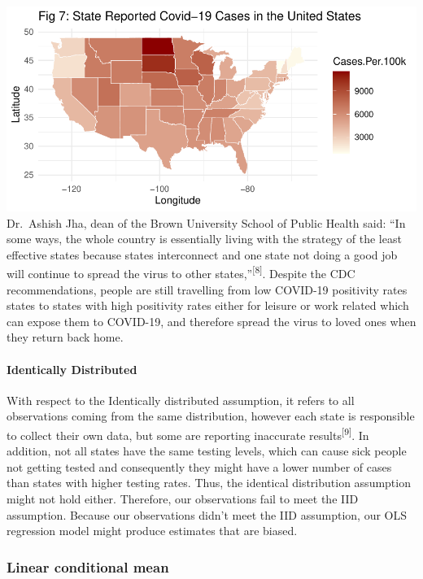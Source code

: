 \documentclass[
]{article}
\begin{document}
\includegraphics{Final_Report_files/figure-latex/iid-1.pdf} Dr.~Ashish
Jha, dean of the Brown University School of Public Health said: ``In
some ways, the whole country is essentially living with the strategy of
the least effective states because states interconnect and one state not
doing a good job will continue to spread the virus to other
states,''\textsuperscript{{[}8{]}}. Despite the CDC recommendations,
people are still travelling from low COVID-19 positivity rates states to
states with high positivity rates either for leisure or work related
which can expose them to COVID-19, and therefore spread the virus to
loved ones when they return back home.

\hypertarget{identically-distributed}{%
\paragraph{Identically Distributed}\label{identically-distributed}}

With respect to the Identically distributed assumption, it refers to all
observations coming from the same distribution, however each state is
responsible to collect their own data, but some are reporting inaccurate
results\textsuperscript{{[}9{]}}. In addition, not all states have the
same testing levels, which can cause sick people not getting tested and
consequently they might have a lower number of cases than states with
higher testing rates. Thus, the identical distribution assumption might
not hold either. Therefore, our observations fail to meet the IID
assumption. Because our observations didn't meet the IID assumption, our
OLS regression model might produce estimates that are biased.

\hypertarget{linear-conditional-mean}{%
\subsubsection{Linear conditional mean}\label{linear-conditional-mean}}
\end{document}

